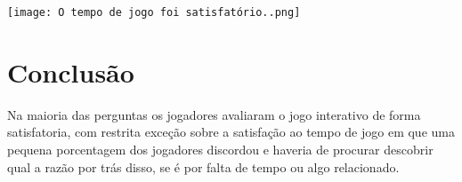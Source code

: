 \documentclass[12pt]{article}
\begin{document}
\begin{center}
  \texttt{[image: O tempo de jogo foi satisfatório..png]}
\end{center}


\section{Conclusão}

Na maioria das perguntas os jogadores avaliaram o jogo interativo de forma satisfatoria, com restrita exceção sobre a satisfação ao tempo de jogo em que uma pequena porcentagem dos jogadores discordou e haveria de procurar descobrir qual a razão por trás disso, se é por falta de tempo ou algo relacionado.



\end{document}
